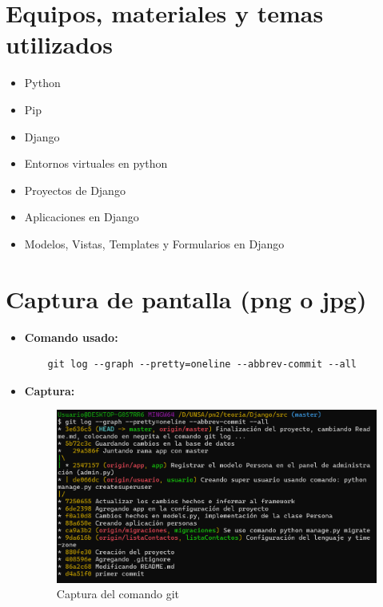 \documentclass{article}
\begin{document}
		
	\section{Equipos, materiales y temas utilizados}
  \begin{itemize}
    \item Python
    \item Pip
    \item Django
    \item Entornos virtuales en python
    \item Proyectos de Django
    \item Aplicaciones en Django
    \item Modelos, Vistas, Templates y Formularios en Django
  \end{itemize}
 

  \section{Captura de pantalla (png o jpg)}
  \begin{itemize}
    \item \textbf{Comando usado:}
    \begin{lstlisting}
    git log --graph --pretty=oneline --abbrev-commit --all
    \end{lstlisting}
    \newpage
    \item \textbf{Captura:}
    \begin{figure}[H]
      \centering
      \includegraphics[width=1\textwidth, keepaspectratio]{img/captura.png}
      \caption{Captura del comando git}
    \end{figure} 
  \end{itemize}
  
\end{document}
